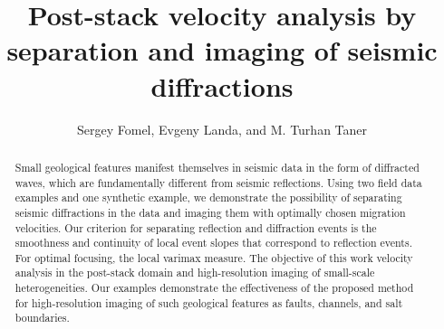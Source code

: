 \title{Post-stack velocity analysis by 
separation and imaging of seismic diffractions}

\renewcommand{\thefootnote}{\fnsymbol{footnote}} 



\author{Sergey Fomel\footnotemark[1],
Evgeny Landa\footnotemark[2], and M. Turhan Taner\footnotemark[3]}

\address{
\footnotemark[1]Bureau of Economic Geology \\
John A. and Katherine G. Jackson School of Geosciences \\
The University of Texas at Austin \\
University Station, Box X \\
Austin, TX 78713-8972 \\
USA \\
\footnotemark[2]OPERA \\ 
Batiment IFR \\
rue Jules Ferry \\
64000 Pau \\
France \\
\footnotemark[3]Rock Solid Images \\
2600 South Gessner, Suite 650 \\
Houston, TX 77063 \\
USA}

\maketitle

\begin{abstract}
  Small geological features manifest themselves in seismic data in the
  form of diffracted waves, which are fundamentally different from
  seismic reflections. Using two field data examples and one synthetic
  example, we demonstrate the possibility of separating seismic
  diffractions in the data and imaging them with optimally chosen
  migration velocities. Our criterion for separating reflection and
  diffraction events is the smoothness and continuity of local event
  slopes that correspond to reflection events.  For
  optimal focusing,   the local varimax
  measure. The objective of this work  
   velocity analysis  in the
  post-stack domain and high-resolution imaging of small-scale
  heterogeneities. Our examples demonstrate the effectiveness of the
  proposed method for high-resolution imaging of such geological
  features as faults, channels, and salt boundaries.
\end{abstract}

